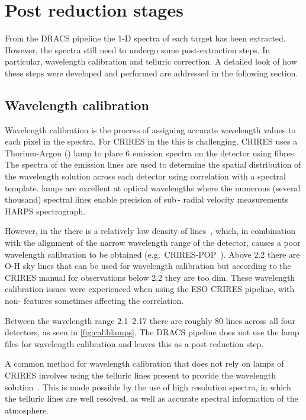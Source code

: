 
\section{Post reduction stages}
\label{sec:posreduction}
From the {DRACS} pipeline the 1-D spectra of each target has been extracted.
However, the spectra still need to undergo some post-extraction steps.
In particular, wavelength calibration and telluric correction.
A detailed look of how these steps were developed and performed are addressed in the following section.

\subsection{Wavelength calibration}
\label{subsec:wavecalib}
Wavelength calibration is the process of assigning accurate wavelength values to each pixel in the spectra.
For {CRIRES} in the \nir{} this is challenging.
{CRIRES} uses a Thorium-Argon (\thar) lamp to place 6 emission spectra on the detector using fibres.
The spectra of the \thar{} emission lines are used to determine the spatial distribution of the wavelength solution across each detector using correlation with a spectral template.
\thar{} lamps are excellent at optical wavelengths where the numerous (several thousand) spectral lines enable precision of sub\,-\mps{} radial velocity measurements {HARPS} spectrograph.

However, in the \nir{} there is a relatively low density of \thar{} lines~\citep{kerber_laboratory_2009}, which, in combination with the alignment of the narrow wavelength range of the detector, causes a poor wavelength calibration to be obtained (e.g.\ {CRIRES}-POP~\citep{nicholls_crirespop_2017}).
Above 2.2\um{} there are {O-H} sky lines that can be used for wavelength calibration but according to the {CRIRES} manual for observations below 2.2\um{} they are too dim.
These wavelength calibration issues were experienced when using the {ESO} {CRIRES} pipeline, with non-\thar{} features sometimes affecting the correlation.

Between the wavelength range 2.1--2.17\um{} there are roughly 80 \thar{} lines across all four detectors, as seen in \cref{fig:caliblamps}.
The {DRACS} pipeline does not use the \thar{} lamp files for wavelength calibration and leaves this as a post reduction step.

A common method for wavelength calibration that does not rely on \thar{} lamps of {CRIRES} involves using the telluric lines present to provide the wavelength solution~\citep[e.g.][]{brogi_signature_2012,brogi_carbon_2014,dekok_detection_2013,piskorz_evidence_2016}.
This is made possible by the use of high resolution spectra, in which the telluric lines are well resolved, as well as accurate spectral information of the atmosphere.


